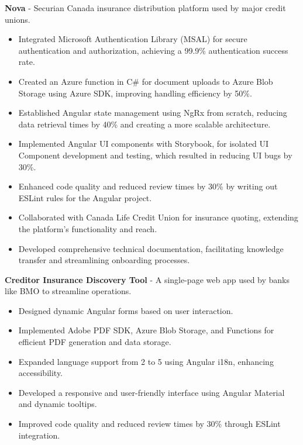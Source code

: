 \documentclass{article}
\begin{document}
\textbf{Nova} - Securian Canada insurance distribution platform used by major credit unions.
\vspace{-5pt}
\begin{itemize}[leftmargin=15pt, itemsep=-5pt]
  \item Integrated Microsoft Authentication Library (MSAL) for secure authentication and authorization, achieving a 99.9\% authentication success rate.
  \item Created an Azure function in C\# for document uploads to Azure Blob Storage using Azure SDK, improving handling efficiency by 50\%.
  \item Established Angular state management using NgRx from scratch, reducing data retrieval times by 40\% and creating a more scalable architecture.
  \item Implemented Angular UI components with Storybook, for isolated UI Component development and testing, which resulted in reducing UI bugs by 30\%.
  \item Enhanced code quality and reduced review times by 30\% by writing out ESLint rules for the Angular project.
  \item Collaborated with Canada Life Credit Union for insurance quoting, extending the platform's functionality and reach.
  \item Developed comprehensive technical documentation, facilitating knowledge transfer and streamlining onboarding processes.
\end{itemize}

\textbf{Creditor Insurance Discovery Tool} - A single-page web app used by banks like BMO to streamline operations.
\vspace{-5pt}
\begin{itemize}[leftmargin=15pt, itemsep=-5pt]
  \item Designed dynamic Angular forms based on user interaction.
  \item Implemented Adobe PDF SDK, Azure Blob Storage, and Functions for efficient PDF generation and data storage.
  \item Expanded language support from 2 to 5 using Angular i18n, enhancing accessibility.
  \item Developed a responsive and user-friendly interface using Angular Material and dynamic tooltips.
  \item Improved code quality and reduced review times by 30\% through ESLint integration.
\end{itemize}
\end{document}
